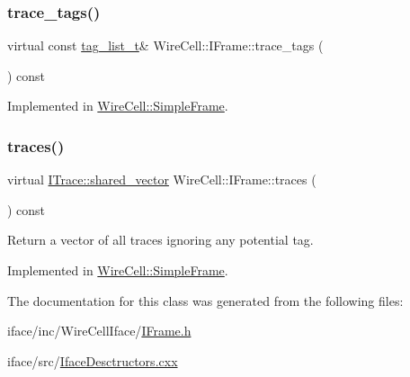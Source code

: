 \subsubsection{\texorpdfstring{trace\+\_\+tags()}{trace\_tags()}}
{\footnotesize\ttfamily virtual const \hyperlink{class_wire_cell_1_1_i_frame_ab34485d40e352997c21b9ec99504ba7c}{tag\+\_\+list\+\_\+t}\& Wire\+Cell\+::\+I\+Frame\+::trace\+\_\+tags (\begin{DoxyParamCaption}{ }\end{DoxyParamCaption}) const\hspace{0.3cm}{\ttfamily [pure virtual]}}



Implemented in \hyperlink{class_wire_cell_1_1_simple_frame_af174d058e161ae60dd374deea25c725c}{Wire\+Cell\+::\+Simple\+Frame}.

\mbox{\label{class_wire_cell_1_1_i_frame_aff349734fe22aafed42c3dc0b7553f64}} 
\subsubsection{\texorpdfstring{traces()}{traces()}}
{\footnotesize\ttfamily virtual \hyperlink{class_wire_cell_1_1_i_data_a6edac35e7dd886018740993b28c7ca1e}{I\+Trace\+::shared\+\_\+vector} Wire\+Cell\+::\+I\+Frame\+::traces (\begin{DoxyParamCaption}{ }\end{DoxyParamCaption}) const\hspace{0.3cm}{\ttfamily [pure virtual]}}



Return a vector of all traces ignoring any potential tag. 



Implemented in \hyperlink{class_wire_cell_1_1_simple_frame_aec2f4f732121b801887077c874cb8b98}{Wire\+Cell\+::\+Simple\+Frame}.



The documentation for this class was generated from the following files\+:\begin{DoxyCompactItemize}
\item 
iface/inc/\+Wire\+Cell\+Iface/\hyperlink{_i_frame_8h}{I\+Frame.\+h}\item 
iface/src/\hyperlink{_iface_desctructors_8cxx}{Iface\+Desctructors.\+cxx}\end{DoxyCompactItemize}
